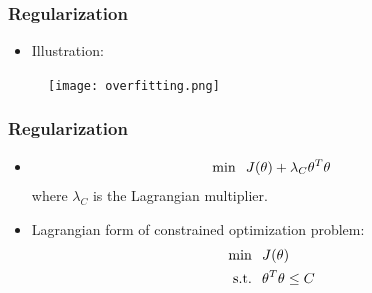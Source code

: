 \begin{frame}
\frametitle{Regularization}
\begin{itemize}
\item Illustration:
\end{itemize}
\begin{figure}
\texttt{[image: overfitting.png]}
\end{figure}
\end{frame}
\begin{frame}
\frametitle{Regularization}
\begin{itemize}
\item 
\begin{equation}
\text{min} \hspace{0.1in} J(\theta) + \lambda_C \theta^T \theta
\end{equation}
where $\lambda_C$ is the Lagrangian multiplier.
\item Lagrangian form of constrained optimization problem:
\begin{align}
\text{min} &\hspace{0.1in} J(\theta)\\
\text{s.t.} &\hspace{0.1in} \theta^T \theta \leq C
\end{align}
\end{itemize}
\end{frame}
